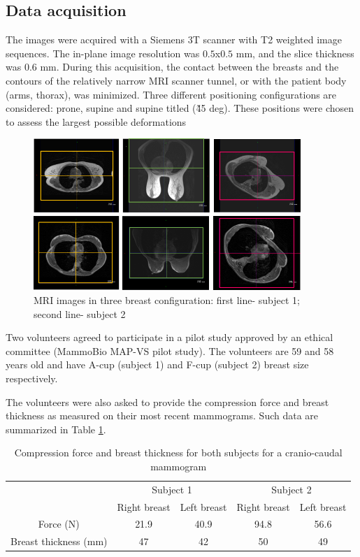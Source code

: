 \subsection{Data acquisition}\label{subsection:imageaquisition}

 The images were acquired with a Siemens 3T scanner with T2 weighted image sequences. The in-plane image resolution was $0.5$x$0.5$ mm, and the slice thickness was 0.6 mm. During this acquisition, the contact between the breasts and the contours of the  relatively narrow MRI scanner tunnel, or with the patient body (arms, thorax), was minimized. Three different positioning configurations are considered: prone, supine and supine titled (\~ 45 deg). These positions were chosen to assess the largest possible deformations
\begin{figure}[H]
\centering
\includegraphics[width=0.9\textwidth,keepaspectratio]{figures/patientData.png} 
\caption{MRI images in three breast configuration: first line- subject 1; second line- subject 2}\label{fig:patientdata}
\end{figure}

Two volunteers agreed to participate in a pilot study approved by an ethical committee (MammoBio MAP-VS pilot study). The volunteers are 59 and 58 years old and have A-cup (subject 1) and F-cup (subject 2) breast size respectively. 
 

The volunteers were also asked to provide the compression force and breast thickness as measured on their most recent mammograms. Such data are summarized in Table \ref{tab:forceandthichnessdata}.
\begin{table}[H]
\centering
\begin{tabular}{c|c|c||c|c|}
\cline{2-5}
&\multicolumn{2}{c||}{Subject 1}&\multicolumn{2}{c|}{Subject 2}\\
\cline{2-5}
& Right breast & Left breast & Right breast & Left breast\\
\cline{2-5}
\hline
\multicolumn{1}{|c||}{Force (N)}  & 21.9 &40.9 &94.8 & 56.6 \\
\hline
\multicolumn{1}{|c||}{ Breast thickness (mm)} & 47 & 42 & 50 & 49 \\
\hline

\end{tabular}
\caption{Compression force and breast thickness for both subjects for a cranio-caudal mammogram}\label{tab:forceandthichnessdata}
\end{table}

